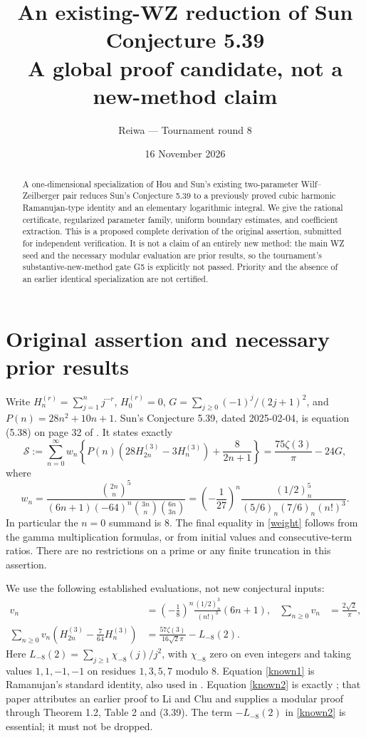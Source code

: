 \documentclass[11pt,a4paper]{article}
\title{An existing-WZ reduction of Sun Conjecture 5.39\\[5pt]\large A global proof candidate, not a new-method claim}
\author{Reiwa --- Tournament round 8}\date{16 November 2026}
\newcommand{\Li}{L_{-8}(2)}\newcommand{\hh}{H^{(3)}}
\begin{document}
\maketitle
\begin{abstract}
A one-dimensional specialization of Hou and Sun's existing two-parameter
Wilf--Zeilberger pair reduces Sun's Conjecture 5.39 to a previously proved
cubic harmonic Ramanujan-type identity and an elementary logarithmic
integral. We give the rational certificate, regularized parameter family,
uniform boundary estimates, and coefficient extraction. This is a proposed
complete derivation of the original assertion, submitted for independent
verification. It is not a claim of an entirely new method: the main WZ seed
and the necessary modular evaluation are prior results, so the tournament's
substantive-new-method gate G5 is explicitly not passed. Priority and the
absence of an earlier identical specialization are not certified.
\end{abstract}

\section{Original assertion and necessary prior results}
Write $H_n^{(r)}=\sum_{j=1}^n j^{-r}$, $H_0^{(r)}=0$,
$G=\sum_{j\ge0}(-1)^j/(2j+1)^2$, and $P(n)=28n^2+10n+1$.
Sun's Conjecture 5.39, dated 2025-02-04, is equation (5.38) on page 32 of
\cite[v10]{Sun}. It states exactly
\begin{equation}\label{target}
 \mathcal S:=\sum_{n=0}^{\infty}w_n
 \left\{P(n)(28H_{2n}^{(3)}-3H_n^{(3)})+\frac8{2n+1}\right\}
 =\frac{75\zeta(3)}\pi-24G,
\end{equation}
where
\begin{equation}\label{weight}
 w_n=\frac{\binom{2n}{n}^{5}}
 {(6n+1)(-64)^n\binom{3n}{n}\binom{6n}{3n}}
 =\left(-\frac1{27}\right)^n
 \frac{(1/2)_n^5}{(5/6)_n(7/6)_n(n!)^3}.
\end{equation}
In particular the $n=0$ summand is $8$. The final equality in
\eqref{weight} follows from the gamma multiplication formulas, or from
initial values and consecutive-term ratios. There are no restrictions on a
prime or any finite truncation in this assertion.

We use the following established evaluations, not new conjectural inputs:
\begin{align}
 v_n&=\left(-\frac18\right)^n\frac{(1/2)_n^3}{(n!)^3}(6n+1),
 &\sum_{n\ge0}v_n&=\frac{2\sqrt2}{\pi},\label{known1}\\
 \sum_{n\ge0}v_n\left(H_{2n}^{(3)}-\frac7{64}H_n^{(3)}\right)
 &=\frac{57\zeta(3)}{16\sqrt2\pi}-\Li.\label{known2}
\end{align}
Here $\Li=\sum_{j\ge1}\chi_{-8}(j)/j^2$, with $\chi_{-8}$ zero on even
integers and taking values $1,1,-1,-1$ on residues $1,3,5,7$ modulo $8$.
Equation \eqref{known1} is Ramanujan's standard identity, also used in
\cite[p.~17]{HS}. Equation \eqref{known2} is exactly
\cite[p.~5, (1.30)]{SZ}; that paper attributes an earlier proof to Li and Chu
and supplies a modular proof through Theorem 1.2, Table 2 and (3.39).
The term $-\Li$ in \eqref{known2} is essential; it must not be dropped.
\end{document}
